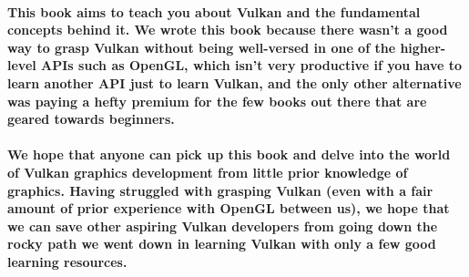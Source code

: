 \paragraph{
This book aims to teach you about Vulkan and the fundamental concepts behind it. We wrote this book because there wasn't a good way to grasp Vulkan without being well-versed in one of the higher-level APIs such as OpenGL, which isn't very productive if you have to learn another API just to learn Vulkan, and the only other alternative was paying a hefty premium for the few books out there that are geared towards beginners.
}

\paragraph{
We hope that anyone can pick up this book and delve into the world of Vulkan graphics development from little prior knowledge of graphics.
Having struggled with grasping Vulkan (even with a fair amount of prior experience with OpenGL between us), we hope that we can save other aspiring Vulkan developers from going down the rocky path we went down in learning Vulkan with only a few good learning resources.
}
